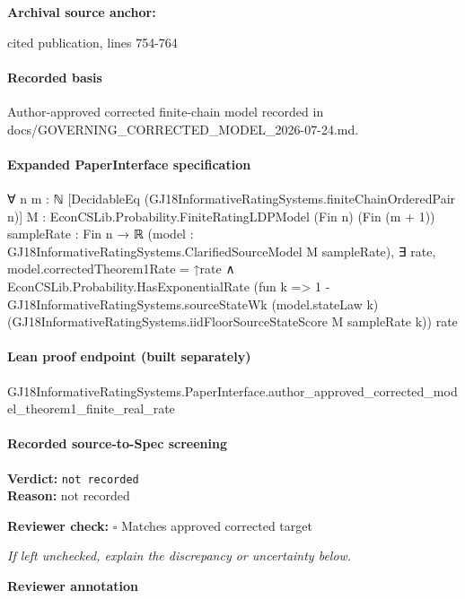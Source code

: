 \documentclass[10pt]{article}
\newcommand{\reviewerbox}{%
  \par\noindent\fbox{\parbox{0.96\linewidth}{\rule{0pt}{0.38in}}}\par
}
\newcommand{\reviewmatch}[1]{%
  \par\noindent\textbf{Reviewer check:} $\square$\; #1\par
  \noindent\emph{If left unchecked, explain the discrepancy or uncertainty below.}\par
}
\begin{document}
\textbf{Archival source anchor:} {\footnotesize\raggedright cited publication, lines 754-\allowbreak{}764\par}
\paragraph{Recorded basis}
Author-\allowbreak{}approved corrected finite-\allowbreak{}chain model recorded in docs/\allowbreak{}GOVERNING\_\allowbreak{}CORRECTED\_\allowbreak{}MODEL\_\allowbreak{}2026-\allowbreak{}07-\allowbreak{}24.\allowbreak{}md.\allowbreak{}
\paragraph{Expanded PaperInterface specification}
\begin{ReviewVerbatim}
∀ {n m : ℕ} [DecidableEq (GJ18InformativeRatingSystems.finiteChainOrderedPair n)]
  {M : EconCSLib.Probability.FiniteRatingLDPModel (Fin n) (Fin (m + 1))} {sampleRate : Fin n → ℝ}
  (model : GJ18InformativeRatingSystems.ClarifiedSourceModel M sampleRate),
  ∃ rate,
    model.correctedTheorem1Rate = ↑rate ∧
      EconCSLib.Probability.HasExponentialRate
        (fun k =>
          1 -
            GJ18InformativeRatingSystems.sourceStateWk (model.stateLaw k)
              (GJ18InformativeRatingSystems.iidFloorSourceStateScore M sampleRate k))
        rate
\end{ReviewVerbatim}

\paragraph{Lean proof endpoint (built separately)}\begin{ReviewVerbatim}
GJ18InformativeRatingSystems.PaperInterface.author_approved_corrected_model_theorem1_finite_real_rate
\end{ReviewVerbatim}

\paragraph{Recorded source-to-Spec screening}
\textbf{Verdict:} \texttt{not recorded}
\\
\textbf{Reason:} not recorded
\reviewmatch{Matches approved corrected target}
\noindent\textbf{Reviewer annotation}\par
\reviewerbox
\end{document}
